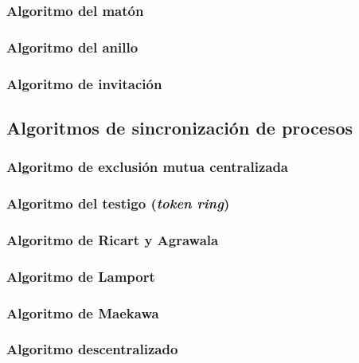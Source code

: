 \documentclass[a4paper, 11pt, titlepage]{article}
\begin{document}
        \subsubsection{Algoritmo del matón}

        \subsubsection{Algoritmo del anillo}

        \subsubsection{Algoritmo de invitación}

    \subsection{Algoritmos de sincronización de procesos}

        \subsubsection{Algoritmo de exclusión mutua centralizada}

        \subsubsection{Algoritmo del testigo (\textit{token ring})}

        \subsubsection{Algoritmo de Ricart y Agrawala}

        \subsubsection{Algoritmo de Lamport}

        \subsubsection{Algoritmo de Maekawa}

        \subsubsection{Algoritmo descentralizado}
\end{document}
